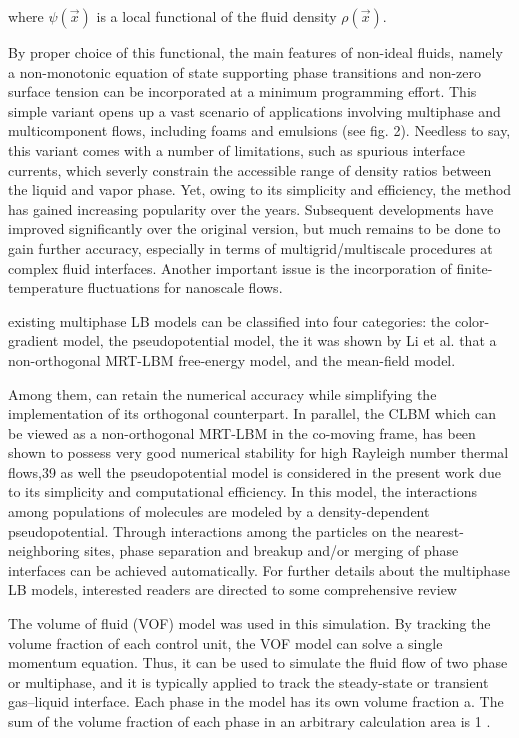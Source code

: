 where $\psi(\vec{x})$ is a local functional of the fluid density $\rho(\vec{x})$.

By proper choice of this functional, the main features of non-ideal fluids, namely a non-monotonic equation of state supporting phase transitions and non-zero surface tension can be incorporated at a minimum programming effort. This simple variant opens up a vast scenario of applications involving multiphase and multicomponent flows, including foams and emulsions (see fig. 2). Needless to say, this variant comes with a number of limitations, such as spurious interface currents, which severly constrain the accessible range of density ratios between the liquid and vapor phase. Yet, owing to its simplicity and efficiency, the method has gained increasing popularity over the years. Subsequent developments have improved significantly over the original version, but much remains to be done to gain further accuracy, especially in terms of multigrid/multiscale procedures at complex fluid interfaces. Another important issue is the incorporation of finite-temperature fluctuations for nanoscale flows.

existing multiphase LB models can be classified into four categories: the color-gradient model, the pseudopotential model, the it was shown by Li et al. that a non-orthogonal MRT-LBM free-energy model, and the mean-field model.
%

Among them, can retain the numerical accuracy while simplifying the implementation of its orthogonal counterpart. In parallel, the CLBM which can be viewed as a non-orthogonal MRT-LBM in the co-moving frame, has been shown to possess very good numerical stability for high Rayleigh number thermal flows,39 as well the pseudopotential model is considered in the present work due to its simplicity and computational efficiency. In this model, the interactions among populations of molecules are modeled by a density-dependent pseudopotential. Through interactions among the particles on the nearest-neighboring sites, phase separation and breakup and/or merging of phase interfaces can be achieved automatically. For further details about the multiphase LB models, interested readers are directed to some comprehensive review

The volume of fluid (VOF) model was used in this simulation. By tracking the volume fraction of each control unit, the VOF model can solve a single momentum equation. Thus, it can be used to simulate the fluid flow of two phase or multiphase, and it is typically applied to track the steady-state or transient gas–liquid interface.
Each phase in the model has its own volume fraction a. The sum of the volume fraction of each phase in an arbitrary calculation area is 1 \cite{lvSimulationFlowFluid2013}.
%

